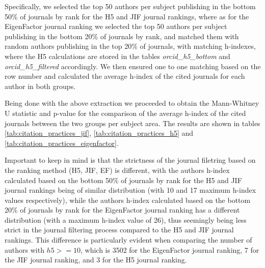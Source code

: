 Specifically, we selected the top 50 authors per subject publishing in the
bottom 50\% of journals by rank for the H5 and JIF journal rankings, where as
for the EigenFactor journal ranking we selected the top 50 authors per subject
publishing in the bottom 20\% of journals by rank, and matched them with random
authors publishing in the top 20\% of journals, with matching h-indexes, where
the H5 calculations are stored in the tables \emph{orcid\_h5\_bottom} and
\emph{orcid\_h5\_filtered} accordingly. We then ensured one to one matching
based on the row number and calculated the average h-index of the cited
journals for each author in both groups.

Being done with the above extraction we proceeded to obtain the Mann-Whitney U
statistic and p-value for the comparison of the average h-index of the cited
journals between the two groups per subject area. The results are shown in
tables \ref{tab:citation_practices_jif}, \ref{tab:citation_practices_h5} and
\ref{tab:citation_practices_eigenfactor}.

Important to keep in mind is that the strictness of the journal filetring based
on the ranking method (H5, JIF, EF) is different, with the authors h-index
calculated based on the bottom 50\% of journals by rank for the H5 and JIF
journal rankings being of similar distribution (with 10 and 17 maximum h-index
values respectively), while the authors h-index calculated based on the bottom
20\% of journals by rank for the EigenFactor journal ranking has a different
distribution (with a maximum h-index value of 26), thus seemingly being less
strict in the journal filtering process compared to the H5 and JIF journal
rankings. This difference is particularly evident when comparing the number of
authors with $h5 >= 10$, which is 3502 for the EigenFactor journal ranking, 7 for
the JIF journal ranking, and 3 for the H5 journal ranking.



